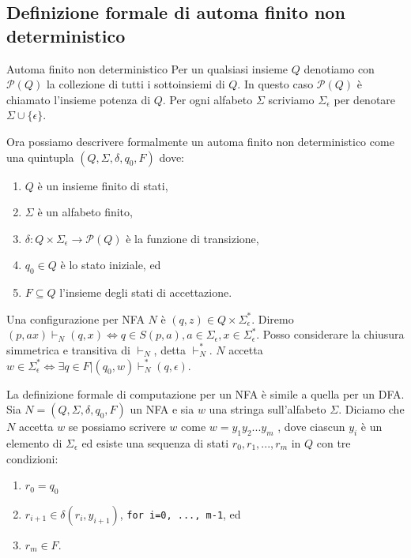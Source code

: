 \subsection{Definizione formale di automa finito non deterministico}
\begin{Definition}{Automa finito non deterministico}{}
    Per un qualsiasi insieme $Q$ denotiamo con $\mathcal{P}(Q)$ la collezione di tutti i sottoinsiemi di $Q$. In questo caso $\mathcal{P}(Q)$ è chiamato l'insieme potenza di $Q$. Per ogni alfabeto $\Sigma$ scriviamo $\Sigma_\epsilon$ per denotare $\Sigma\cup\{\epsilon\}$. 
    
    Ora possiamo descrivere formalmente un automa finito non deterministico come una quintupla $(Q, \Sigma, \delta, q_{0}, F)$ dove:
    \begin{enumerate}
        \item $Q$ è un insieme finito di stati,
        \item $\Sigma$ è un alfabeto finito,
        \item $\delta: Q\times \Sigma_\epsilon\to\mathcal{P}(Q)$ è la funzione di transizione,
        \item $q_{0} \in Q$ è lo stato iniziale, ed
        \item $F\subseteq Q$ l'insieme degli stati di accettazione.
    \end{enumerate}    
\end{Definition}

Una configurazione per NFA $N$ è $(q, z)\in Q\times\Sigma^*_\epsilon$. Diremo $(p, ax)\vdash_N(q, x)\iff q\in S(p, a), a\in\Sigma_\epsilon, x\in\Sigma^*_\epsilon$. Posso considerare la chiusura simmetrica e transitiva di $\vdash_N$, detta $\vdash_N^*$. $N$ accetta $w\in\Sigma_\epsilon^*\iff\exists q\in F|(q_0, w)\vdash_N^*(q, \epsilon)$.

La definizione formale di computazione per un NFA è simile a quella per un DFA. Sia $N = (Q, \Sigma, \delta, q_{0}, F)$ un NFA e sia $w$ una stringa sull'alfabeto $\Sigma$. Diciamo che $N$ accetta $w$ se possiamo scrivere $w$ come $w= y_{1}y_{2} ... y_m$ , dove ciascun $y_{i}$ è un elemento di $\Sigma_{\epsilon}$ ed esiste una sequenza di stati $r_{0}, r_{1},...,r_m$ in $Q$ con tre condizioni:
\begin{enumerate}
    \item $r_{0} = q_{0}$
    \item $r_{i + 1} \in \delta(r_i ,y_{i+1})$, \texttt{for i=0, ..., m-1}, ed
    \item $r_{m} \in F$.
\end{enumerate}

